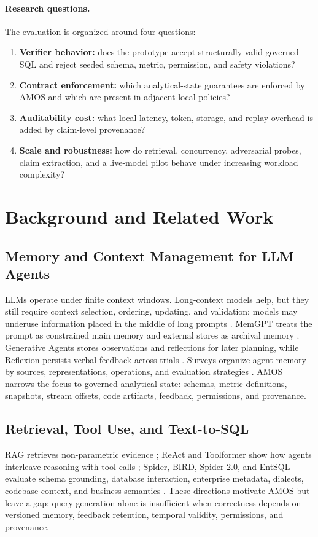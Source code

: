 \documentclass[sigconf,nonacm]{acmart}
\newcommand{\amos}{\textsc{AMOS}\xspace}
\begin{document}
\paragraph{Research questions.} The evaluation is organized around four questions:
\begin{enumerate}
    \item[RQ1.] \textbf{Verifier behavior:} does the prototype accept structurally valid governed SQL and reject seeded schema, metric, permission, and safety violations?
    \item[RQ2.] \textbf{Contract enforcement:} which analytical-state guarantees are enforced by \amos and which are present in adjacent local policies?
    \item[RQ3.] \textbf{Auditability cost:} what local latency, token, storage, and replay overhead is added by claim-level provenance?
    \item[RQ4.] \textbf{Scale and robustness:} how do retrieval, concurrency, adversarial probes, claim extraction, and a live-model pilot behave under increasing workload complexity?
\end{enumerate}

\section{Background and Related Work}

\subsection{Memory and Context Management for LLM Agents}
LLMs operate under finite context windows. Long-context models help, but they still require context selection, ordering, updating, and validation; models may underuse information placed in the middle of long prompts \cite{lostinthemiddle}. MemGPT treats the prompt as constrained main memory and external stores as archival memory \cite{memgpt}. Generative Agents stores observations and reflections for later planning, while Reflexion persists verbal feedback across trials \cite{generativeagents,reflexion}. Surveys organize agent memory by sources, representations, operations, and evaluation strategies \cite{memorysurvey}. \amos narrows the focus to governed analytical state: schemas, metric definitions, snapshots, stream offsets, code artifacts, feedback, permissions, and provenance.

\subsection{Retrieval, Tool Use, and Text-to-SQL}
RAG retrieves non-parametric evidence \cite{rag}; ReAct and Toolformer show how agents interleave reasoning with tool calls \cite{react,toolformer}; Spider, BIRD, Spider 2.0, and EntSQL evaluate schema grounding, database interaction, enterprise metadata, dialects, codebase context, and business semantics \cite{spider,bird,spider2,entsql}. These directions motivate \amos but leave a gap: query generation alone is insufficient when correctness depends on versioned memory, feedback retention, temporal validity, permissions, and provenance.
\end{document}
